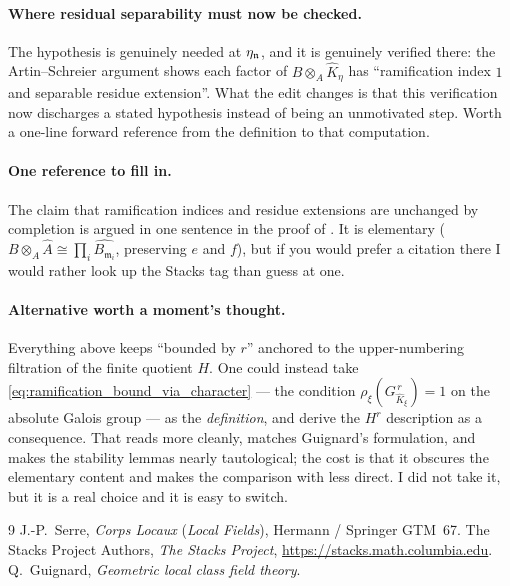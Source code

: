 \documentclass[11pt]{report}
\begin{document}
\paragraph{Where residual separability must now be checked.}
The hypothesis is genuinely needed at $\eta_{\mathfrak{n}}$, and it is genuinely
verified there: the Artin--Schreier argument shows each factor of
$B\otimes_A\widehat K_\eta$ has ``ramification index $1$ and separable residue
extension''. What the edit changes is that this verification now discharges a
stated hypothesis instead of being an unmotivated step. Worth a one-line
forward reference from the definition to that computation.

\paragraph{One reference to fill in.}
The claim that ramification indices and residue extensions are unchanged by
completion is argued in one sentence in the proof of
. It is elementary
($B\otimes_A\widehat A\cong\prod_i\widehat{B_{\mathfrak m_i}}$, preserving $e$
and $f$), but if you would prefer a citation there I would rather look up the
Stacks tag than guess at one.

\paragraph{Alternative worth a moment's thought.}
Everything above keeps ``bounded by $r$'' anchored to the upper-numbering
filtration of the finite quotient $H$. One could instead take
\eqref{eq:ramification_bound_via_character} --- the condition
$\rho_\xi(G^{\,r}_{\widehat K_\xi})=1$ on the absolute Galois group --- as the
\emph{definition}, and derive the $H^r$ description as a consequence. That
reads more cleanly, matches Guignard's formulation, and makes the stability
lemmas nearly tautological; the cost is that it obscures the elementary content
and makes the comparison with
 less direct. I did not take it,
but it is a real choice and it is easy to switch.

\begin{thebibliography}{9}
 J.-P.~Serre, \emph{Corps Locaux} (\emph{Local Fields}),
Hermann / Springer GTM~67.
 The Stacks Project Authors, \emph{The Stacks Project},
\url{https://stacks.math.columbia.edu}.
 Q.~Guignard, \emph{Geometric local class field theory}.
\end{thebibliography}
\end{document}
